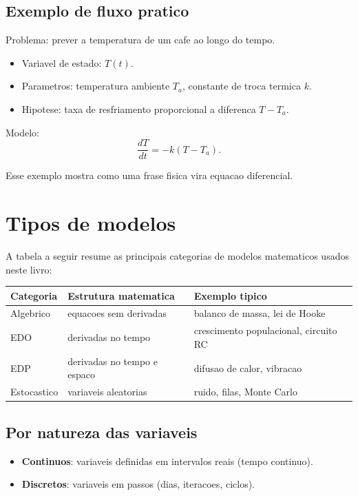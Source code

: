 \documentclass[12pt,a4paper,oneside]{book}
\theoremstyle{definition}
\begin{document}
\subsection{Exemplo de fluxo pratico}

Problema: prever a temperatura de um cafe ao longo do tempo.

\begin{itemize}
    \item Variavel de estado: $T(t)$.
    \item Parametros: temperatura ambiente $T_a$, constante de troca termica $k$.
    \item Hipotese: taxa de resfriamento proporcional a diferenca $T-T_a$.
\end{itemize}

Modelo:
\begin{equation}
\frac{dT}{dt}=-k(T-T_a).
\end{equation}

Esse exemplo mostra como uma frase fisica vira equacao diferencial.

\section{Tipos de modelos}

A tabela a seguir resume as principais categorias de modelos matematicos usados neste livro:

\begin{center}
\begin{tabular}{lll}
\toprule
\textbf{Categoria} & \textbf{Estrutura matematica} & \textbf{Exemplo tipico} \\
\midrule
Algebrico & equacoes sem derivadas & balanco de massa, lei de Hooke \\
EDO & derivadas no tempo & crescimento populacional, circuito RC \\
EDP & derivadas no tempo e espaco & difusao de calor, vibracao \\
Estocastico & variaveis aleatorias & ruido, filas, Monte Carlo \\
\bottomrule
\end{tabular}
\end{center}

\subsection{Por natureza das variaveis}

\begin{itemize}
    \item \textbf{Continuos}: variaveis definidas em intervalos reais (tempo continuo).
    \item \textbf{Discretos}: variaveis em passos (dias, iteracoes, ciclos).
\end{itemize}
\end{document}
